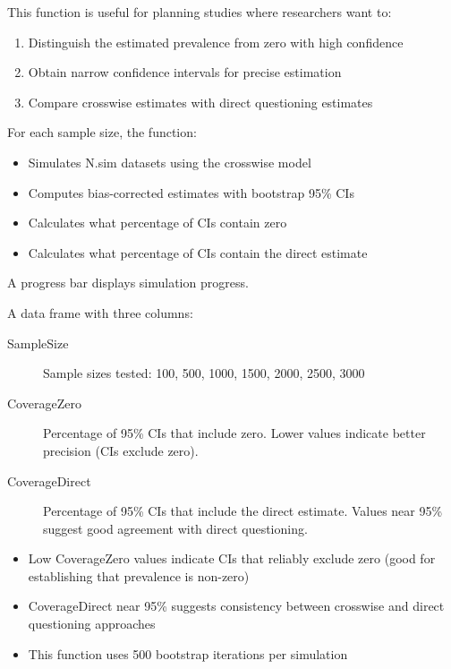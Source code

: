 \documentclass[a4paper]{book}
\begin{document}
\begin{Details}
This function is useful for planning studies where researchers want to:
\begin{enumerate}

\item{} Distinguish the estimated prevalence from zero with high confidence
\item{} Obtain narrow confidence intervals for precise estimation
\item{} Compare crosswise estimates with direct questioning estimates

\end{enumerate}


For each sample size, the function:
\begin{itemize}

\item{} Simulates N.sim datasets using the crosswise model
\item{} Computes bias-corrected estimates with bootstrap 95\% CIs
\item{} Calculates what percentage of CIs contain zero
\item{} Calculates what percentage of CIs contain the direct estimate

\end{itemize}


A progress bar displays simulation progress.
\end{Details}
%
\begin{Value}
A data frame with three columns:
\begin{description}

\item[SampleSize] Sample sizes tested: 100, 500, 1000, 1500, 2000, 2500, 3000
\item[CoverageZero] Percentage of 95\% CIs that include zero.
Lower values indicate better precision (CIs exclude zero).
\item[CoverageDirect] Percentage of 95\% CIs that include the direct estimate.
Values near 95\% suggest good agreement with direct questioning.

\end{description}

\end{Value}
%
\begin{Note}
\begin{itemize}

\item{} Low CoverageZero values indicate CIs that reliably exclude zero
(good for establishing that prevalence is non-zero)
\item{} CoverageDirect near 95\% suggests consistency between crosswise and
direct questioning approaches
\item{} This function uses 500 bootstrap iterations per simulation

\end{itemize}

\end{Note}
\end{document}
